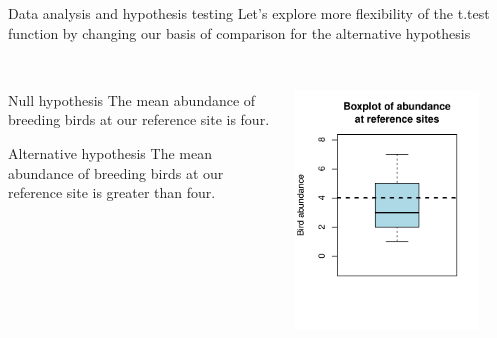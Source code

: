 \documentclass[xcolor=svgnames]{beamer}
\begin{document}
\begin{frame}[t]{Data analysis and hypothesis testing}
Let's explore more flexibility of the t.test function by changing our basis of comparison for the alternative hypothesis\\~\\
\begin{columns}
\begin{column}{0.5\textwidth}
\begin{block}{Null hypothesis}
The mean abundance of breeding birds at our reference site is four.
\end{block}
\vspace{0.2in}
\begin{block}{Alternative hypothesis}
The mean abundance of breeding birds at our reference site is greater than four.
\end{block}
\end{column}
\begin{column}{0.5\textwidth}
\centerline{\includegraphics[width=0.85\textwidth,trim=0in 0.8in 0in 0in]{R_for_data_analysis-hyp2.pdf}}
\end{column}
\end{columns}
\end{frame}
\end{document}
